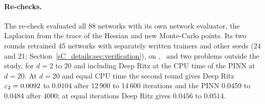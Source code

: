 \paragraph{Re-checks.} The re-check evaluated all 88 networks with its own network evaluator,
the Laplacian from the trace of the Hessian and new Monte-Carlo points. Its two rounds retrained
45 networks with separately written trainers and other seeds (24 and 21;
Section~\ref{sC_details:sec:verification}), on \Pone, \Ptwo\ and two problems outside the study,
for $d=2$ to 20 and including Deep Ritz at the CPU time of the PINN at $d=20$. At $d=20$ and equal
CPU time the second round gives Deep Ritz $\varepsilon_{2}=0.0092$ to $0.0104$ after 12\,900 to 14\,600
iterations and the PINN $0.0459$ to $0.0484$ after 4000; at equal iterations Deep Ritz gives
$0.0456$ to $0.0514$.

